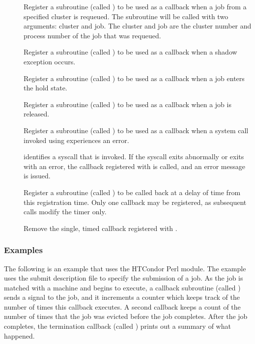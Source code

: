 \begin{description}
  \item []
  Register a subroutine (called )
  to be used as a callback when a job from
  a specified cluster is requeued.  The subroutine will be
  called with two arguments: cluster and job. The cluster
  and job are the cluster number and process number of the job that
  was requeued.

  \item []
  Register a subroutine (called )
  to be used as a callback when a shadow exception occurs.

  \item []
  Register a subroutine (called )
  to be used as a callback when a job enters the hold state.

  \item []
  Register a subroutine (called )
  to be used as a callback when a job is released.

  \item []
  Register a subroutine (called )
  to be used as a callback when a system call invoked using 
  experiences an error.

  \item []
   identifies a syscall that is invoked.
  If the syscall exits abnormally or exits with an error, the callback
  registered with  is called, and
  an error message is issued.

  \item []
  Register a subroutine (called )
  to be called back at a delay of  time from
  this registration time.  Only one callback may be registered,
  as subsequent calls modify the timer only.

  \item []
  Remove the single, timed callback registered with .

\end{description}


\subsubsection{Examples}

The following is an example that uses the HTCondor Perl module.
The example uses the submit description file 
 to specify the submission of a job.
As the job is matched with a machine and begins to execute,
a callback  subroutine (called \verb@execute@)
sends a  signal to the job,
and it increments a counter which keeps track of the
number of times this callback executes.
A second callback keeps a count of the number of times
that the job was evicted before the job completes.
After the job completes, the termination
callback (called \verb@normal@) prints out a summary of what happened.

